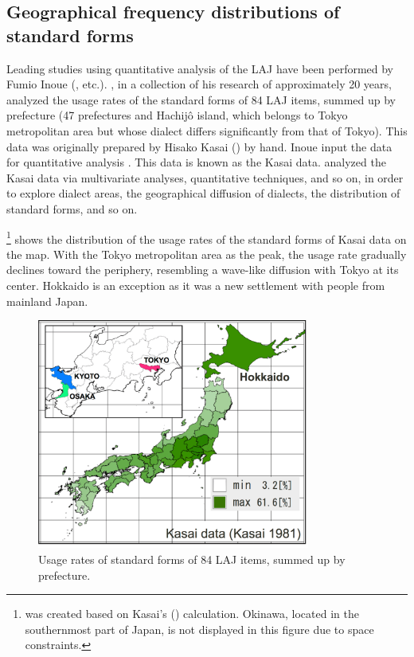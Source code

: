 \documentclass[output=paper]{LSP/langsci}
\begin{document}
\subsection{Geographical frequency distributions of standard forms}
\largerpage[-1]
Leading studies using quantitative analysis of the LAJ have been performed by Fumio Inoue (\citealt{inoue_keiryoteki_2001}, etc.). \citet{inoue_keiryoteki_2001}, in a collection of his research of approximately 20 years, analyzed the usage rates of the standard forms of 84 LAJ items, summed up by prefecture (47 prefectures and Hachijô island, which belongs to Tokyo metropolitan area but whose dialect differs significantly from that of Tokyo). This data was originally prepared by Hisako Kasai (\citeyear{kasai_hyojun_1981}) by hand. Inoue input the data for quantitative analysis \citep[89]{inoue_keiryoteki_2001}. This data is known as the Kasai data. \citet{inoue_keiryoteki_2001} analyzed the Kasai data via multivariate analyses, quantitative techniques, and so on, in order to explore dialect areas, the geographical diffusion of dialects, the distribution of standard forms, and so on.

\footnote{ was created based on Kasai’s (\citeyear{kasai_hyojun_1981}) calculation. Okinawa, located in the southernmost part of Japan, is not displayed in this figure due to space constraints.} shows the distribution of the usage rates of the standard forms of Kasai data on the map. With the Tokyo metropolitan area as the peak, the usage rate gradually declines toward the periphery, resembling a wave-like diffusion with Tokyo at its center. Hokkaido is an exception as it was a new settlement with people from mainland Japan.
\begin{figure}
\includegraphics[width=0.8\textwidth]{illustrations/kuma_fig03}
\caption{Usage rates of standard forms of 84 LAJ items, summed up by prefecture.}          
\label{fig:kuma:3}
\end{figure} 
\end{document}
